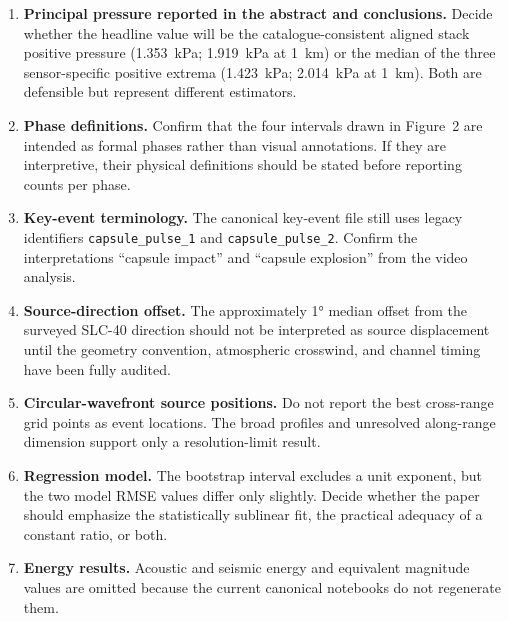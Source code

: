 \documentclass[12pt]{article}
\begin{document}
\begin{enumerate}[leftmargin=*]
  \item \textbf{Principal pressure reported in the abstract and conclusions.}
  Decide whether the headline value will be the catalogue-consistent aligned
  stack positive pressure (\SI{1.353}{\kilo\pascal};
  \SI{1.919}{\kilo\pascal} at \SI{1}{\kilo\metre}) or the median of the three
  sensor-specific positive extrema (\SI{1.423}{\kilo\pascal};
  \SI{2.014}{\kilo\pascal} at \SI{1}{\kilo\metre}). Both are defensible but
  represent different estimators.

  \item \textbf{Phase definitions.} Confirm that the four intervals drawn in
  Figure~2 are intended as formal phases rather than visual annotations. If they
  are interpretive, their physical definitions should be stated before reporting
  counts per phase.

  \item \textbf{Key-event terminology.} The canonical key-event file still uses
  legacy identifiers \texttt{capsule\_pulse\_1} and
  \texttt{capsule\_pulse\_2}. Confirm the interpretations ``capsule impact'' and
  ``capsule explosion'' from the video analysis.

  \item \textbf{Source-direction offset.} The approximately \ang{1} median
  offset from the surveyed SLC-40 direction should not be interpreted as source
  displacement until the geometry convention, atmospheric crosswind, and
  channel timing have been fully audited.

  \item \textbf{Circular-wavefront source positions.} Do not report the best
  cross-range grid points as event locations. The broad profiles and unresolved
  along-range dimension support only a resolution-limit result.

  \item \textbf{Regression model.} The bootstrap interval excludes a unit
  exponent, but the two model RMSE values differ only slightly. Decide whether
  the paper should emphasize the statistically sublinear fit, the practical
  adequacy of a constant ratio, or both.

  \item \textbf{Energy results.} Acoustic and seismic energy and equivalent
  magnitude values are omitted because the current canonical notebooks do not
  regenerate them.
\end{enumerate}
\end{document}
